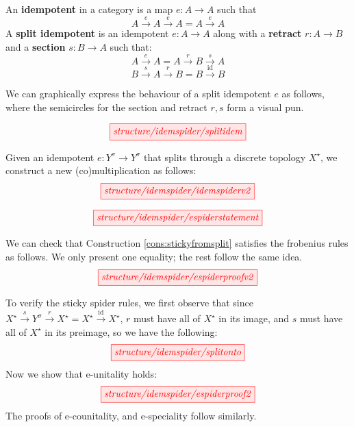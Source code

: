 \begin{myboxR}
\begin{rem}
An \textbf{idempotent} in a category is a map $e: A \rightarrow A$ such that \[A \overset{e}{\rightarrow} A \overset{e}{\rightarrow} A = A \overset{e}{\rightarrow} A\]
A \textbf{split idempotent} is an idempotent $e: A \rightarrow A$ along with a \textbf{retract} $r: A \rightarrow B$ and a \textbf{section} $s: B \rightarrow A$ such that:
\[A \overset{e}{\rightarrow} A = A \overset{r}{\rightarrow} B \overset{s}{\rightarrow} A\]
\[B \overset{s}{\rightarrow} A \overset{r}{\rightarrow} B = B \overset{\mathop{id}}{\rightarrow} B\]
\end{rem}

We can graphically express the behaviour of a split idempotent $e$ as follows, where the semicircles for the section and retract $r,s$ form a visual pun.

\[\scalebox{1}{\tikzfig{structure/idemspider/splitidem}}\]
\end{myboxR}

\begin{myboxB}
\begin{construction}\label{cons:stickyfromsplit}
Given an idempotent $e: Y^\sigma \rightarrow Y^\sigma$ that splits through a discrete topology $X^\star$, we construct a new (co)multiplication as follows:
\[\scalebox{1}{\tikzfig{structure/idemspider/idemspiderv2}}\]
\end{construction}
\end{myboxB}

\begin{myboxR}
\begin{proposition}\label{prop:splitmeanssticky}
\[\scalebox{1}{\tikzfig{structure/idemspider/espiderstatement}}\]
\end{proposition}
We can check that Construction \ref{cons:stickyfromsplit} satisfies the frobenius rules as follows. We only present one equality; the rest follow the same idea.
\[\scalebox{1}{\tikzfig{structure/idemspider/espiderproofv2}}\]
\end{myboxR}
\begin{myboxR}
To verify the sticky spider rules, we first observe that since $X^\star \overset{s}{\rightarrow} Y^\sigma \overset{r}{\rightarrow} X^\star = X^\star \overset{\mathop{id}}{\rightarrow} X^\star$, $r$ must have all of $X^\star$ in its image, and $s$ must have all of $X^\star$ in its preimage, so we have the following:
\[\scalebox{1}{\tikzfig{structure/idemspider/splitonto}}\]
Now we show that e-unitality holds:
\[\scalebox{1}{\tikzfig{structure/idemspider/espiderproof2}}\]
The proofs of e-counitality, and e-speciality follow similarly.
\end{myboxR}

